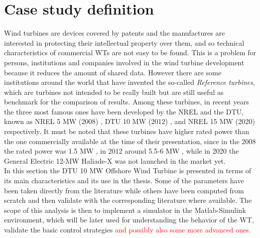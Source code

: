 \newpage
\section{Case study definition}\label{sec:c_10MW_OWT}
Wind turbines are devices covered by patents and the manufactures are interested in protecting their intellectual property over them, and so technical characteristics of commercial \acrshort{WTs} are not easy to be found. This is a problem for persons, institutions and companies involved in the wind turbine development because it reduces the amount of shared data. However there are some institutions around the world that have invented the so-called \textit{Reference turbines}, which are turbines not intended to be really built but are still useful as benchmark for the comparison of results. Among these turbines, in recent years the three most famous ones have been developed by the \acrfull{NREL} and the \acrfull{DTU}, known as NREL 5 MW (2008) \cite{NREL_5MW_reference}, DTU 10 MW (2012) \cite{DTU_Wind_Energy_Report-I-0092}, and NREL 15 MW (2020) \cite{NREL_15MW} respectively. It must be noted that these turbines have higher rated power than the one commercially available at the time of their presentation, since in the 2008 the rated power was 1.5 MW \cite{Wind_Energy_Technology_Current_Status_and_RD_Futur}, in 2012 around 5.5-6 MW \cite{European_offshore_statistics_2012}, while in 2020 the General Electric 12-MW Haliade-X was not launched in the market yet. \\
In this section the DTU 10 MW Offshore Wind Turbine is presented in terms of its main characteristics and its use in the thesis. Some of the parameters have been taken directly from the literature while others have been computed from scratch and then validate with the corresponding literature where available. The scope of this analysis is then to implement a simulator in the Matlab-Simulink environment, which will be later used for understanding the behavior of the WT, validate the basic control strategies \textcolor{red}{and possibly also some more advanced ones.}  

